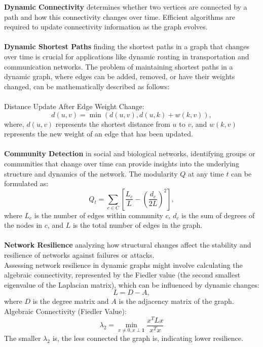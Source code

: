 \documentclass[12pt]{article}
\begin{document}
    \textbf{Dynamic Connectivity} determines whether two vertices are connected by a path and how this
    connectivity changes over time. Efficient algorithms are required to update
    connectivity information as the graph evolves.\\
    \\
    \textbf{Dynamic Shortest Paths} finding the shortest paths in a graph that changes over time is crucial
    for applications like dynamic routing in transportation and communication
    networks. The problem of maintaining shortest paths in a dynamic graph, where edges
    can be added, removed, or have their weights changed, can be mathematically
    described as follows:\\
    \\
    Distance Update After Edge Weight Change:
    \begin{equation}
        d(u, v) = \min(d(u, v), d(u, k) + w(k, v)),
    \end{equation}
    where, \( d(u, v) \) represents the shortest distance from \( u \) to \( v \),
    and \( w(k, v) \) represents the new weight of an edge that has been updated.\\
    \\
    \textbf{Community Detection} in social and biological networks, identifying groups or communities that
    change over time can provide insights into the underlying structure and
    dynamics of the network. The modularity \( Q \) at any time \( t \) can be
    formulated as:
    \begin{equation}
        Q_t = \sum_{c \in C} \left[ \frac{L_c}{L} - \left( \frac{d_c}{2L} \right)^2 \right],
    \end{equation}
    where \( L_c \) is the number of edges within community \( c \), \( d_c \) is the
    sum of degrees of the nodes in \( c \), and \( L \) is the total number of edges
    in the graph.\\
    \\
    \textbf{Network Resilience}
    analyzing how structural changes affect the stability and resilience of
    networks against failures or attacks.\\
    Assessing network resilience in dynamic graphs might involve calculating the
    algebraic connectivity, represented by the Fiedler value (the second smallest
    eigenvalue of the Laplacian matrix), which can be influenced by dynamic changes:
    \begin{equation}
        L = D - A,
    \end{equation}
    where \( D \) is the degree matrix and \( A \) is the adjacency matrix of the
    graph.\\
    Algebraic Connectivity (Fiedler Value):
    \begin{equation}
        \lambda_2 = \min_{x \neq 0, x \perp \mathbf{1}} \frac{x^T L x}{x^T x}
    \end{equation}
    The smaller \( \lambda_2 \) is, the less connected the graph is, indicating
    lower resilience.

\newpage

\printbibliography
\end{document}
